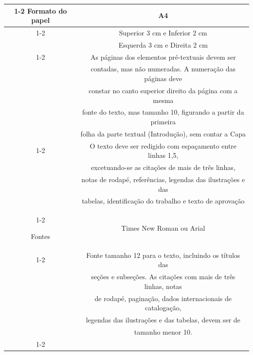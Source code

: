 {\begin{quadro}[htb]
\centering
\caption{Exemplo de quadro}
\label{quadro_modelo}

\begin{tabular}{|c|c|}
\cline{1-2}
	Formato do papel  & A4\\ \cline{1-2}
	
	\multirow{2}{*}{Margens}& Superior 3 cm e Inferior 2 cm\\ 
                            &  Esquerda 3 cm e Direita 2 cm\\ \cline{1-2}
    
    \multirow{5}{*}{Paginação}  & As páginas dos elementos pré-textuais devem ser\\ 
                                &contadas, mas não numeradas. A numeração das páginas deve\\ 
                                &constar no canto superior direito da página com a mesma \\   
                                &fonte do texto, mas tamanho 10, figurando a partir da primeira \\ 
                                &folha da parte textual (Introdução), sem contar a Capa\\ \cline{1-2}
  
  \multirow{4}{*}{Espaçamento}  & O texto deve ser redigido com  espaçamento entre linhas 1,5,\\
                                & excetuando-se as citações de mais de três linhas, \\
                                &  notas de rodapé, referências, legendas das ilustrações e das \\
                                &  tabelas, identificação do trabalho e texto de aprovação \\ \cline{1-2}
              
  Fontes & Times New Roman ou Arial \\ \cline{1-2}
  
\multirow{5}{*}{Tamanho da fonte}& Fonte tamanho 12 para o texto, incluindo os títulos das\\
                                &seções e subseções. As citações com mais de três linhas, notas\\ 
                                &de rodapé, paginação, dados internacionais de catalogação,\\ 
                                &legendas das ilustrações e das tabelas, devem ser de\\
                                &tamanho menor 10.\\ \cline{1-2}
                

\end{tabular}
\end{quadro}}
